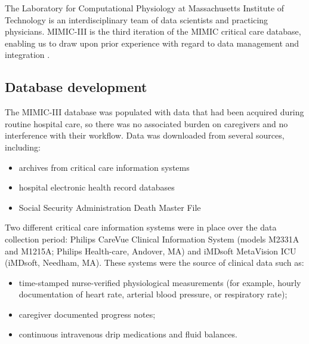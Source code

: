 \documentclass[english]{article}
\begin{document}
The Laboratory for Computational Physiology at Massachusetts Institute of Technology is an interdisciplinary team of data scientists and practicing physicians. MIMIC-III is the third iteration of the MIMIC critical care database, enabling us to draw upon prior experience with regard to data management and integration \cite{cite3}.

\subsection*{Database development}

The MIMIC-III database was populated with data that had been acquired during routine hospital care, so there was no associated burden on caregivers and no interference with their workflow. Data was downloaded from several sources, including:
\begin{itemize}
  \item archives from critical care information systems
  \item hospital electronic health record databases
  \item Social Security Administration Death Master File
\end{itemize}
Two different critical care information systems were in place over the data collection period: Philips CareVue Clinical Information System (models M2331A and M1215A; Philips Health-care, Andover, MA) and iMDsoft MetaVision ICU (iMDsoft, Needham, MA). These systems were the source of clinical data such as:
\begin{itemize}
  \item time-stamped nurse-verified physiological measurements (for example, hourly documentation of heart rate, arterial blood pressure, or respiratory rate);
  \item caregiver documented progress notes;
  \item continuous intravenous drip medications and fluid balances.
\end{itemize}
\end{document}
